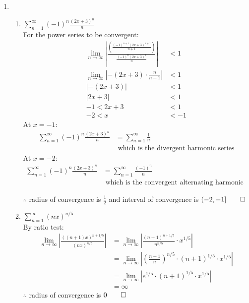 \documentclass[12pt, a4paper]{article}
\begin{document}
\begin{enumerate}[Q\arabic*.]
  \pagebreak
  \item 
    \begin{enumerate}[(\alph*)]
      \item $\displaystyle \sum^{\infty}_{n=1}(-1)^n \frac{(2x+3)^n}{n}$\\
        For the power series to be convergent:
        \begin{align*}
          \lim_{n\rightarrow\infty}|\frac{(\frac{(-1)^{n+1}(2x+3)^{n+1}}{n+1})}{\frac{(-1)^n(2x+3)^n}{n}}| &< 1\\
          \lim_{n\rightarrow\infty}|-(2x+3)\cdot \frac{n}{n+1}| &< 1\\
          |-(2x+3)| &< 1\\
          |2x+3| &< 1\\
          -1 < 2x+3 &< 1\\
          -2 < x &< -1
        \end{align*}
        At $x=-1$:
        \begin{align*}
          \sum^{\infty}_{n=1}(-1)^n \frac{(2x+3)^n}{n} &= \sum^{\infty}_{n=1}\frac{1}{n}\\&\text{ which is the divergent harmonic series}
        \end{align*}
        At $x=-2$:
        \begin{align*}
          \sum^{\infty}_{n=1}(-1)^n \frac{(2x+3)^n}{n} &= \sum^{\infty}_{n=1}\frac{(-1)^n}{n}\\&\text{ which is the convergent alternating harmonic series}
        \end{align*}

        $\therefore$ radius of convergence is $\frac{1}{2}$ and interval of convergence is $(-2, -1] \qed$ 

      \item $\displaystyle \sum^{\infty}_{n=1} (nx)^{n/5}$\\
        By ratio test:
        \begin{align*}
          \lim_{n\rightarrow\infty}|\frac{((n+1)x)^{n+1/5}}{(nx)^{n/5}}| &= \lim_{n\rightarrow\infty}|\frac{(n+1)^{n+1/5}}{n^{n/5}} \cdot x^{1 /5}|\\
                                                                         &= \lim_{n\rightarrow\infty}|(\frac{n+1}{n})^{n/5}\cdot (n+1)^{1/5} \cdot x^{1/5}|\\
                                                                         &= \lim_{n\rightarrow\infty}|e^{1/5} \cdot (n+1)^{1/5} \cdot x^{1/5}|\\
                                                                         &= \infty
        \end{align*}
        $\therefore$ radius of convergence is $0 \qed$
    \end{enumerate}
    \pagebreak


\end{enumerate}
\end{document}
